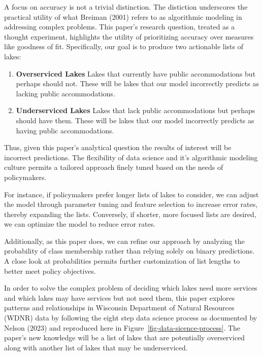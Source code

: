 \documentclass[
]{article}
\providecommand{\tightlist}{%
  \setlength{\itemsep}{0pt}\setlength{\parskip}{0pt}}\usepackage{longtable,booktabs,array}
\begin{document}
A focus on accuracy is not a trivial distinction. The distiction
underscores the practical utility of what Breiman (2001) refers to as
algorithmic modeling in addressing complex problems. This paper's
research question, treated as a thought experiment, highlights the
utility of prioritizing accuracy over measures like goodness of fit.
Specifically, our goal is to produce two actionable lists of lakes:

\begin{enumerate}
\def\labelenumi{\arabic{enumi}.}
\tightlist
\item
  \textbf{Overserviced Lakes} Lakes that currently have public
  accommodations but perhaps should not. These will be lakes that our
  model incorrectly predicts as lacking public accommodations.
\item
  \textbf{Underserviced Lakes} Lakes that lack public accommodations but
  perhaps should have them. These will be lakes that our model
  incorrectly predicts as having public accommodations.
\end{enumerate}

Thus, given this paper's analytical question the results of interest
will be incorrect predictions. The flexibility of data science and it's
algorithmic modeling culture permits a tailored approach finely tuned
based on the needs of policymakers.

For instance, if policymakers prefer longer lists of lakes to consider,
we can adjust the model through parameter tuning and feature selection
to increase error rates, thereby expanding the lists. Conversely, if
shorter, more focused lists are desired, we can optimize the model to
reduce error rates.

Additionally, as this paper does, we can refine our approach by
analyzing the probability of class membership rather than relying solely
on binary predictions. A close look at probabilities permits further
customization of list lengths to better meet policy objectives.

In order to solve the complex problem of deciding which lakes need more
services and which lakes may have services but not need them, this paper
explores patterns and relationships in Wisconsin Department of Natural
Resources (WDNR) data by following the eight step data science process
as documented by Nelson (2023) and reproduced here in
Figure~\ref{fig-data-sicence-process}. The paper's new knowledge will be
a list of lakes that are potentially overserviced along with another
list of lakes that may be underserviced.
\end{document}
